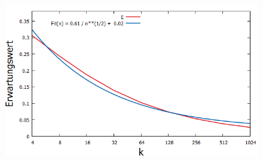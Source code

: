 \begin{figure}[H]
    \hspace*{-0.8cm}
    \begin{minipage}[t]{.30\textwidth}
        \centering
        \includegraphics[width=1.2\textwidth]{pictures/min_filter_D_k.png}
    \end{minipage}
    \hspace*{.8cm}
    \begin{minipage}[t]{.30\textwidth}
        \centering
    \end{minipage}  
    \hspace*{.5cm}
    \begin{minipage}[t]{.30\textwidth}
        \centering

\end{minipage}
\end{figure}
